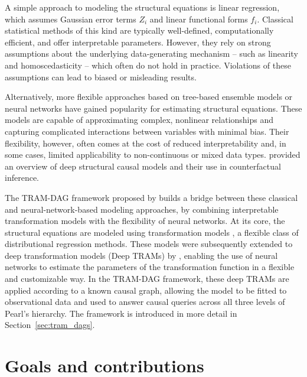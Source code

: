 %


A simple approach to modeling the structural equations is linear regression, which assumes Gaussian error terms $Z_i$ and linear functional forms $f_i$. Classical statistical methods of this kind are typically well-defined, computationally efficient, and offer interpretable parameters. However, they rely on strong assumptions about the underlying data-generating mechanism -- such as linearity and homoscedasticity -- which often do not hold in practice. Violations of these assumptions can lead to biased or misleading results.

Alternatively, more flexible approaches based on tree-based ensemble models or neural networks have gained popularity for estimating structural equations. These models are capable of approximating complex, nonlinear relationships and capturing complicated interactions between variables with minimal bias. Their flexibility, however, often comes at the cost of reduced interpretability and, in some cases, limited applicability to non-continuous or mixed data types. \citet{poinsot2024} provided an overview of deep structural causal models and their use in counterfactual inference.

The TRAM-DAG framework proposed by \citet{sick2025} builds a bridge between these classical and neural-network-based modeling approaches, by combining interpretable transformation models with the flexibility of neural networks. At its core, the structural equations are modeled using transformation models \citep{hothorn2014}, a flexible class of distributional regression methods. These models were subsequently extended to deep transformation models (Deep TRAMs) by \citet{sick2020}, enabling the use of neural networks to estimate the parameters of the transformation function in a flexible and customizable way. In the TRAM-DAG framework, these deep TRAMs are applied according to a known causal graph, allowing the model to be fitted to observational data and used to answer causal queries across all three levels of Pearl's hierarchy. The framework is introduced in more detail in Section~\ref{sec:tram_dags}.





\section{Goals and contributions} \label{sec:goals_contributions}

